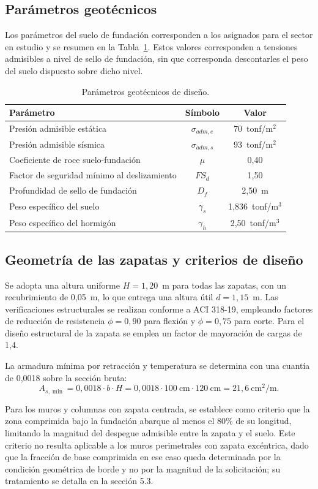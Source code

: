 \subsection{Parámetros geotécnicos}
Los parámetros del suelo de fundación corresponden a los asignados para el sector en estudio y se resumen en la Tabla~\ref{tab:geotecnicos}. Estos valores corresponden a tensiones admisibles a nivel de sello de fundación, sin que corresponda descontarles el peso del suelo dispuesto sobre dicho nivel.

\begin{table}[H]
\centering
\caption{Parámetros geotécnicos de diseño.}
\label{tab:geotecnicos}
\begin{tabular}{lcc}
\hline
Parámetro & Símbolo & Valor \\
\hline
Presión admisible estática & $\sigma_{adm,e}$ & 70~tonf/m$^2$ \\
Presión admisible sísmica & $\sigma_{adm,s}$ & 93~tonf/m$^2$ \\
Coeficiente de roce suelo-fundación & $\mu$ & 0,40 \\
Factor de seguridad mínimo al deslizamiento & $FS_d$ & 1,50 \\
Profundidad de sello de fundación & $D_f$ & 2,50~m \\
Peso específico del suelo & $\gamma_s$ & 1,836~tonf/m$^3$ \\
Peso específico del hormigón & $\gamma_h$ & 2,50~tonf/m$^3$ \\
\hline
\end{tabular}
\end{table}

\subsection{Geometría de las zapatas y criterios de diseño}
Se adopta una altura uniforme $H = 1,20$~m para todas las zapatas, con un recubrimiento de 0,05~m, lo que entrega una altura útil $d = 1,15$~m. Las verificaciones estructurales se realizan conforme a ACI 318-19, empleando factores de reducción de resistencia $\phi = 0,90$ para flexión y $\phi = 0,75$ para corte. Para el diseño estructural de la zapata se emplea un factor de mayoración de cargas de 1,4.

La armadura mínima por retracción y temperatura se determina con una cuantía de 0,0018 sobre la sección bruta:
\begin{equation}
A_{s,\min} = 0,0018 \cdot b \cdot H = 0,0018 \cdot 100~\mathrm{cm} \cdot 120~\mathrm{cm} = 21,6~\mathrm{cm^2/m}.
\end{equation}

Para los muros y columnas con zapata centrada, se establece como criterio que la zona comprimida bajo la fundación abarque al menos el 80\% de su longitud, limitando la magnitud del despegue admisible entre la zapata y el suelo. Este criterio no resulta aplicable a los muros perimetrales con zapata excéntrica, dado que la fracción de base comprimida en ese caso queda determinada por la condición geométrica de borde y no por la magnitud de la solicitación; su tratamiento se detalla en la sección 5.3.